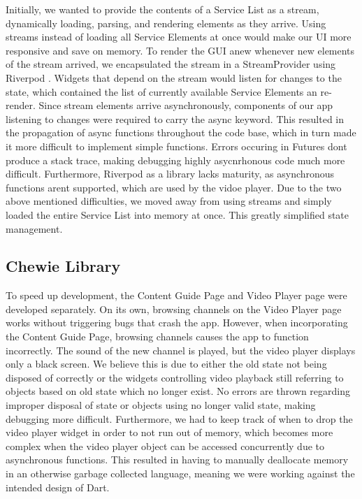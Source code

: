 \documentclass[conference]{IEEEtran}
\begin{document}
Initially, we wanted to provide the contents of a Service List as a stream, dynamically loading, parsing, and rendering elements as they arrive.
Using streams instead of loading all Service Elements at once would make our UI more responsive and save on memory.
To render the GUI anew whenever new elements of the stream arrived, we encapsulated the stream in a StreamProvider using Riverpod \cite{RiverPod}. Widgets that depend on the stream would listen for changes to the state, which contained the list of currently available Service Elements an re-render. Since stream elements arrive asynchronously, components of our app listening to changes were required to carry the async keyword. This resulted in the propagation of async functions throughout the code base, which in turn made it more difficult to implement simple functions. Errors occuring in Futures dont produce a stack trace, making debugging highly asycnrhonous code much more difficult. Furthermore, Riverpod as a library lacks maturity, as asynchronous functions arent supported, which are used by the vidoe player. Due to the two above mentioned difficulties, we moved away from using streams and simply loaded the entire Service List into memory at once. This greatly simplified state management.

\subsection{Chewie Library} 
To speed up development, the Content Guide Page and Video Player page were developed separately. On its own, browsing channels on the Video Player page works without triggering bugs that crash the app. However, when incorporating the Content Guide Page, browsing channels causes the app to function incorrectly. The sound of the new channel is played, but the video player displays only a black screen. We believe this is due to either the old state not being disposed of correctly or the widgets controlling video playback still referring to objects based on old state which no longer exist. No errors are thrown regarding improper disposal  of state or objects using no longer valid state, making debugging more difficult. Furthermore, we had to keep track of when to drop the video player widget in order to not run out of memory, which becomes more complex when the video player object can be accessed concurrently due to asynchronous functions. This resulted in having to manually deallocate memory in an otherwise garbage collected language, meaning we were working against the intended design of Dart.
\end{document}
